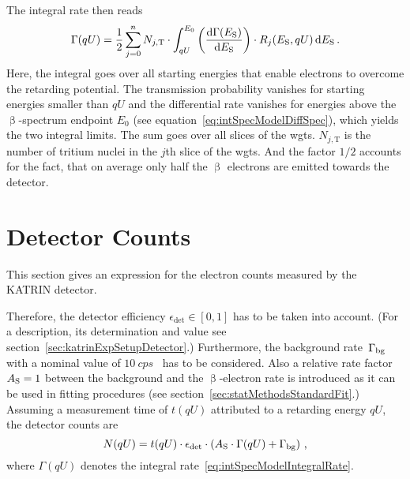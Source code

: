 The integral rate then reads~\cite{Kleesiek2019}
\begin{equation}
	\label{eq:intSpecModelIntegralRate}
	\Gamma(qU) = 
	\frac{1}{2} 
	\sum_{j=0}^{n} N_{j, \mathrm{T}} \cdot
		\int_{qU}^{E_0} 
			\left(\frac{\mathop{}\!\mathrm{d} \Gamma(E_\mathrm{S})}{ \mathop{}\!\mathrm{d} E_\mathrm{S}}\right) \cdot 
			R_j(E_\mathrm{S}, qU) 
		\mathop{}\!\mathrm{d} E_\mathrm{S}
		\text{\,.}
\end{equation}
Here, the integral goes over all starting energies that enable electrons to overcome the retarding potential. The transmission probability vanishes for starting energies smaller than $qU$ and the differential rate vanishes for energies above the $\upbeta$-spectrum endpoint $E_0$ (see equation~\ref{eq:intSpecModelDiffSpec}), which yields the two integral limits. The sum goes over all slices of the \gls{wgts}. $N_{j, \mathrm{T}}$ is the number of tritium nuclei in the $j$th slice of the \gls{wgts}. And the factor $1/2$ accounts for the fact, that on average only half the $\upbeta$ electrons are emitted towards the detector.

\section{Detector Counts}
\label{sec:intSpecModelDetectorCounts}
This section gives an expression for the electron counts measured by the KATRIN detector. 

Therefore, the detector efficiency \mbox{$\epsilon_\mathrm{det}\in[0,1]$} has to be taken into account. (For a description, its determination and value see section~\ref{sec:katrinExpSetupDetector}.) Furthermore, the background rate~$\Gamma_{\mathrm{bg}}$ with a nominal value of $\SI{10}{cps}$~\cite{Angrik:2005ep} has to be considered. Also a relative rate factor $A_{\mathrm{S}}=1$ between the background and the $\upbeta$-electron rate is introduced as it can be used in fitting procedures (see section~\ref{sec:statMethodsStandardFit}.) Assuming a measurement time of $t(qU)$ attributed to a retarding energy $qU$, the detector counts are~\cite{Kleesiek2014}
\begin{equation}
\label{eq:intSpecModelDetectorCounts}
	N(qU) = t(qU)\cdot\epsilon_\mathrm{det}\cdot
	\left(
		A_{\mathrm{S}}\cdot \Gamma(qU) + \Gamma_{\mathrm{bg}}
	\right)
	\text{\,,}
\end{equation}
where $\Gamma(qU)$ denotes the integral rate~\eqref{eq:intSpecModelIntegralRate}. 

